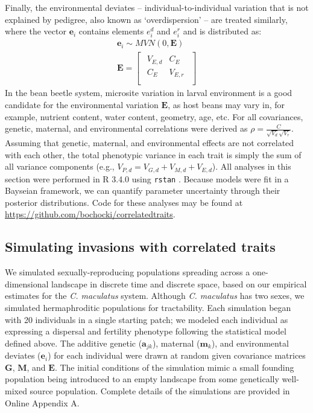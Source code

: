 \documentclass[11pt]{article}
\def\code#1{\texttt{#1}}
\begin{document}
Finally, the environmental deviates -- individual-to-individual variation that is not explained by pedigree, also known as `overdispersion' \citep{de2016general} -- are treated similarly, where the vector $\bm{e}_{i}$ contains elements $e^{d}_{i}$ and $e^{r}_{i}$ and is distributed as:
%
\begin{gather} \label{corr:env}
  \bm{e}_{i} \sim \mathit{MVN} (0, \bm{E}) \\[5pt]
  \bm{E} =
  \begin{bmatrix}
    \begin{array}{ll}
      V_{E,d} &C_{E}   \\
      C_{E}   &V_{E,r} \\
    \end{array}
  \end{bmatrix}
\end{gather}
%
In the bean beetle system, microsite variation in larval environment is a good candidate for the environmental variation $\bm{E}$, as host beans may vary in, for example, nutrient content, water content, geometry, age, etc.
For all covariances, genetic, maternal, and environmental correlations were derived as $\rho = \frac{C}{\sqrt{V_{d}}\sqrt{V_{r}}}$.
Assuming that genetic, maternal, and environmental effects are not correlated with each other, the total phenotypic variance in each trait is simply the sum of all variance components (e.g., $V_{P,d} = V_{G,d} + V_{M,d} + V_{E,d}$). 
All analyses in this section were performed in R 3.4.0 \citep{r_core_team_r:_2015} using \code{rstan} \citep{stan_development_team_rstan:_2015}.
Because models were fit in a Bayseian framework, we can quantify parameter uncertainty through their posterior distributions.
Code for these analyses may be found at \url{https://github.com/bochocki/correlatedtraits}.

\subsection*{Simulating invasions with correlated traits}
We simulated sexually-reproducing populations spreading across a one-dimensional landscape in discrete time and discrete space, based on our empirical estimates for the \textit{C. maculatus} system.
Although \textit{C. maculatus} has two sexes, we simulated hermaphroditic populations for tractability.
Each simulation began with 20 individuals in a single starting patch; we modeled each individual as expressing a dispersal and fertility phenotype following the statistical model defined above.
The additive genetic ($\bm{a}_{jk}$), maternal ($\bm{m}_{k}$), and environmental deviates ($\bm{e}_i$) for each individual were drawn at random given covariance matrices $\bm{G}$, $\bm{M}$, and $\bm{E}$.
The initial conditions of the simulation mimic a small founding population being introduced to an empty landscape from some genetically well-mixed source population.
Complete details of the simulations are provided in Online Appendix A.
\end{document}
